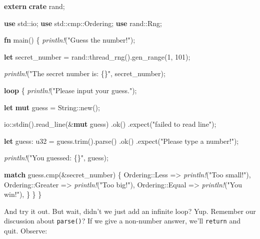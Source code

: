 \documentclass[a4paper,]{book}
\newenvironment{Shaded}{\begin{snugshade}}{\end{snugshade}}
\newcommand{\KeywordTok}[1]{\textcolor[rgb]{0.13,0.29,0.53}{\textbf{{#1}}}}
\newcommand{\DataTypeTok}[1]{\textcolor[rgb]{0.13,0.29,0.53}{{#1}}}
\newcommand{\DecValTok}[1]{\textcolor[rgb]{0.00,0.00,0.81}{{#1}}}
\newcommand{\StringTok}[1]{\textcolor[rgb]{0.31,0.60,0.02}{{#1}}}
\newcommand{\PreprocessorTok}[1]{\textcolor[rgb]{0.56,0.35,0.01}{\textit{{#1}}}}
\newcommand{\NormalTok}[1]{{#1}}
\begin{document}
\begin{Shaded}
\begin{Highlighting}[]
\KeywordTok{extern} \KeywordTok{crate} \NormalTok{rand;}

\KeywordTok{use} \NormalTok{std::io;}
\KeywordTok{use} \NormalTok{std::cmp::Ordering;}
\KeywordTok{use} \NormalTok{rand::Rng;}

\KeywordTok{fn} \NormalTok{main() \{}
    \PreprocessorTok{println!}\NormalTok{(}\StringTok{"Guess the number!"}\NormalTok{);}

    \KeywordTok{let} \NormalTok{secret_number = rand::thread_rng().gen_range(}\DecValTok{1}\NormalTok{, }\DecValTok{101}\NormalTok{);}

    \PreprocessorTok{println!}\NormalTok{(}\StringTok{"The secret number is: \{\}"}\NormalTok{, secret_number);}

    \KeywordTok{loop} \NormalTok{\{}
        \PreprocessorTok{println!}\NormalTok{(}\StringTok{"Please input your guess."}\NormalTok{);}

        \KeywordTok{let} \KeywordTok{mut} \NormalTok{guess = }\DataTypeTok{String}\NormalTok{::new();}

        \NormalTok{io::stdin().read_line(&}\KeywordTok{mut} \NormalTok{guess)}
            \NormalTok{.ok()}
            \NormalTok{.expect(}\StringTok{"failed to read line"}\NormalTok{);}

        \KeywordTok{let} \NormalTok{guess: }\DataTypeTok{u32} \NormalTok{= guess.trim().parse()}
            \NormalTok{.ok()}
            \NormalTok{.expect(}\StringTok{"Please type a number!"}\NormalTok{);}

        \PreprocessorTok{println!}\NormalTok{(}\StringTok{"You guessed: \{\}"}\NormalTok{, guess);}

        \KeywordTok{match} \NormalTok{guess.cmp(&secret_number) \{}
            \NormalTok{Ordering::Less    => }\PreprocessorTok{println!}\NormalTok{(}\StringTok{"Too small!"}\NormalTok{),}
            \NormalTok{Ordering::Greater => }\PreprocessorTok{println!}\NormalTok{(}\StringTok{"Too big!"}\NormalTok{),}
            \NormalTok{Ordering::Equal   => }\PreprocessorTok{println!}\NormalTok{(}\StringTok{"You win!"}\NormalTok{),}
        \NormalTok{\}}
    \NormalTok{\}}
\NormalTok{\}}
\end{Highlighting}
\end{Shaded}

And try it out. But wait, didn't we just add an infinite loop? Yup.
Remember our discussion about \texttt{parse()}? If we give a non-number
answer, we'll \texttt{return} and quit. Observe:
\end{document}

